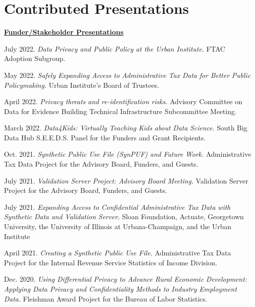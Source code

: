 \documentclass[11pt, letterpaper, roman]{moderncv} %
\begin{document}
\section{Contributed Presentations}
\underline{\textbf{\large Funder/Stakeholder Presentations}}\normalsize
\vspace{4pt}
\begin{etaremune}[topsep=0pt, itemsep=0.75pt, partopsep=0pt, parsep=0pt]
    \item July 2022. \textit{Data Privacy and Public Policy at the Urban Institute.} FTAC Adoption Subgroup.
    
    \item May 2022. \textit{Safely Expanding Access to Administrative Tax Data for Better Public Policymaking.} Urban Institute's Board of Trustees.
    
    \item April 2022. \textit{Privacy threats and re-identification risks.} Advisory Committee on Data for Evidence Building Technical Infrastructure Subcommittee Meeting.
    
    \item March 2022. \textit{Data4Kids: Virtually Teaching Kids about Data Science.} South Big Data Hub S.E.E.D.S. Panel for the Funders and Grant Recipients.
    
    \item Oct. 2021. \textit{Synthetic Public Use File (SynPUF) and Future Work.} Administrative Tax Data Project for the Advisory Board, Funders, and Guests.
    
    \item July 2021. \textit{Validation Server Project: Advisory Board Meeting.} Validation Server Project for the Advisory Board, Funders, and Guests.
    
    \item July 2021. \textit{Expanding Access to Confidential Administrative Tax Data with Synthetic Data and Validation Server.} Sloan Foundation, Actuate, Georgetown University, the University of Illinois at Urbana-Champaign, and the Urban Institute
    
    \item April 2021. \textit{Creating a Synthetic Public Use File.} Administrative Tax Data Project for the Internal Revenue Service Statistics of Income Division.

    \item Dec. 2020. \textit{Using Differential Privacy to Advance Rural Economic Development: Applying Data Privacy and Confidentiality Methods to Industry Employment Data.} Fleishman Award Project for the Bureau of Labor Statistics.
    

\end{etaremune}
\end{document}

